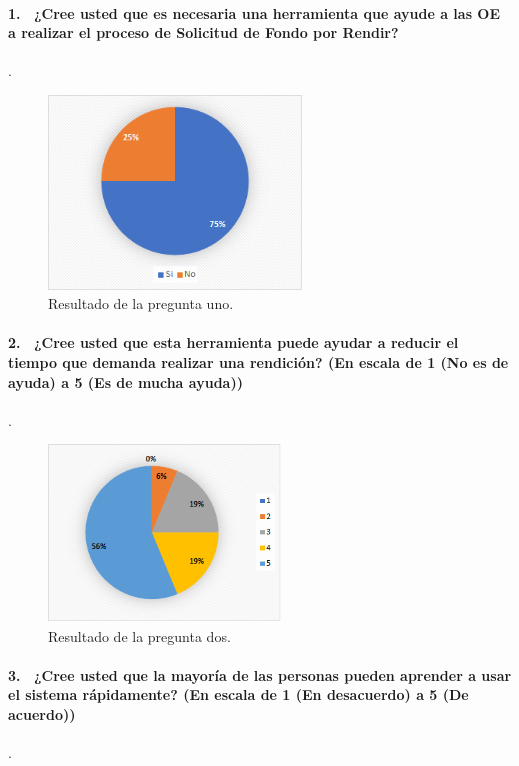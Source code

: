 \paragraph{1.  ¿Cree usted que es necesaria una herramienta que ayude a las OE a realizar el proceso de Solicitud de Fondo por Rendir?}.

    \begin{figure}[h!]
        \centering
        \includegraphics[width=0.6\textwidth]{Imagenes/Pregunta1.png}
        \caption{\label{fig: Pregunta1}Resultado de la pregunta uno.}
    \end{figure}
\newpage
\paragraph{2.  ¿Cree usted que esta herramienta puede ayudar a reducir el tiempo que demanda realizar una rendición? (En escala de 1 (No es de ayuda) a 5 (Es de mucha ayuda))}.

\begin{figure}[h!]
    \centering
    \includegraphics[width=0.55\textwidth]{Imagenes/Pregunta2.png}
    \caption{\label{fig: Pregunta2}Resultado de la pregunta dos.}
\end{figure}

\paragraph{3.  ¿Cree usted que la mayoría de las personas pueden aprender a usar el sistema rápidamente? (En escala de 1 (En desacuerdo) a 5 (De acuerdo))}.

